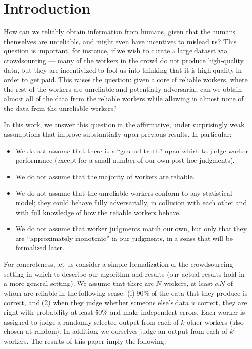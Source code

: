 \section{Introduction}
\label{sec:intro}


How can we reliably obtain information from humans, given that the humans 
themselves are unreliable, and might even have incentives to mislead us?
This question is important, for instance, if we wish to curate a large 
dataset via crowdsourcing --- many of the workers in the crowd do not produce 
high-quality data, but they are incentivized to fool us into thinking that 
it is high-quality in order to get paid. This raises the question: given a 
core of reliable workers, where the rest of the workers are unreliable and 
potentially adversarial, can we obtain almost all of the data from the 
reliable workers while allowing in almost none of the data from the 
unreliable workers?

In this work, we answer this question in the affirmative, under surprisingly 
weak assumptions that improve substantially upon previous results. 
In particular:
\begin{itemize}
\item We do not assume that there is a ``ground truth'' upon which to judge 
      worker performance (except for a small number of our own post hoc judgments).
\item We do not assume that the majority of workers are reliable.
\item We do not assume that the unreliable workers conform to any statistical 
      model; they could behave fully adversarially, in collusion with each other 
      and with full knowledge of how the reliable workers behave.
\item We do not assume that worker judgments match our own, but only that they are 
      ``approximately monotonic'' in our judgments, in a sense that will be 
      formalized later.
\end{itemize}
For concreteness, let us consider a simple formalization of the crowdsourcing 
setting in which to describe our algorithm and results (our actual results hold 
in a more general setting). We assume that there are $N$ workers, at least 
$\alpha N$ of whom are reliable in the following sense: (i) $90\%$ of the data 
that they produce is correct, and (2) when they judge whether someone else's data 
is correct, they are right with probability at least $60\%$ and make independent 
errors. Each worker is assigned to judge a randomly selected output from each 
of $k$ other workers (also chosen at random). In addition, we ourselves judge 
an output from each of $k'$ workers. The results of this paper imply the 
following:

